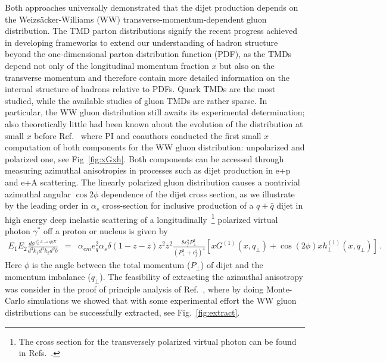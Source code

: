 Both approaches universally demonstrated that the dijet production depends on   
the Weiz\-s\"acker-Williams (WW) transverse-momentum-dependent  gluon distribution.  
The TMD parton distributions signify the recent progress achieved in developing 
frameworks to extend our understanding of hadron structure  beyond the one-dimensional
parton distribution function (PDF), as the TMDs depend not only of the longitudinal momentum 
fraction $x$ but also on the transverse momentum and therefore contain more 
detailed information on the internal structure of hadrons relative to PDFs.
Quark TMDs are the most studied, while the available studies of gluon TMDs 
are rather sparse. In particular, the WW gluon distribution still awaits its experimental 
determination; also theoretically little had been known about the evolution of the distribution at small $x$ 
before Ref.~\cite{Dumitru:2015gaa} where PI and coauthors conducted the first small $x$ computation of 
both components for the WW gluon distribution: unpolarized and polarized one, see Fig~\ref{fig:xGxh}. 
Both components can be accessed through measuring azimuthal anisotropies in processes 
such as dijet production in e+p and e+A scattering. The linearly polarized
gluon distribution causes  a nontrivial azimuthal angular $\cos 2\phi$ dependence of the dijet cross section, 
as we illustrate by the leading order in $\alpha_s$  cross-section for inclusive
production of a $q+\bar q$ dijet in high energy deep inelastic
scattering of a longitudinally~\footnote{The cross section for the transversely polarized virtual photon can be found in Refs.~\cite{Metz:2011wb,Dominguez:2011wm}.} polarized virtual photon $\gamma^*$ off a proton or nucleus is
given by~\cite{Metz:2011wb,Dominguez:2011wm}
\begin{eqnarray}
E_1E_2
\frac{d\sigma ^{\gamma _{L}^{\ast }A\rightarrow q\bar{q}X}}{d^3k_1d^3k_2 d^2b}
&=&\alpha _{em}e_{q}^{2}\alpha _{s}\delta \left( 1-z-\bar z\right) z^2\bar z^2\frac{8\epsilon _{f}^{2}{P}_{\perp }^{2}}{(
{P}_{\perp }^{2}+\epsilon _{f}^{2})^{4}}  %
\left[ xG^{(1)}(x,q_{\perp })+\cos \left(2
  \phi\right)xh_{\perp }^{(1)}(x,q_{\perp })\right]\, .
\label{eq:dijet_L}
\end{eqnarray}
Here $\phi$ is the angle between the total momentum  ($P_\perp$) of dijet and the momentum imbalance  ($q_\perp$).
The feasibility of extracting the azimuthal anisotropy was 
consider in the proof of principle analysis of  Ref.~\cite{TODO}, where by doing Monte-Carlo simulations 
we showed that with some experimental effort the WW gluon distributions can
be successfully extracted, see Fig.~\ref{fig:extract}.

